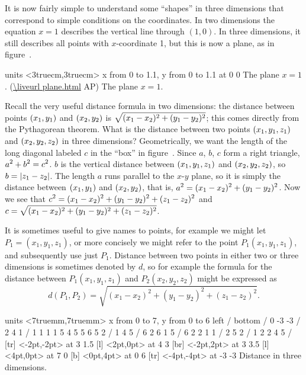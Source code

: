 It is now fairly simple to understand some ``shapes'' in three
dimensions that correspond to simple conditions on the coordinates. In
two dimensions the equation $x=1$ describes the vertical line through
$(1,0)$. In three dimensions, it still describes all points with
$x$-coordinate 1, but this is now a plane, as in
figure~.

\figure
\texonly
\vbox{\beginpicture
\normalgraphs
\ninepoint
\setcoordinatesystem units <3truecm,3truecm>
\setplotarea x from 0 to 1.1, y from 0 to 1.1
 at 0 0
\endpicture}
\begincaption
The plane $x=1$.
(\expandafter\url\expandafter{\liveurl plane.html}%
AP\endurl)
\endcaption
\endtexonly
{}
\begincaption
The plane $x=1$.
\endcaption
\endfigure

Recall the very useful distance formula in two dimensions: the
distance between points $\displaystyle (x_1,y_1)$ and $\displaystyle (x_2,y_2)$ is
$\displaystyle \sqrt{(x_1-x_2)^2+(y_1-y_2)^2}$; this comes directly from the
Pythagorean theorem. What is the distance between two points
$\displaystyle (x_1,y_1,z_1)$ and $\displaystyle (x_2,y_2,z_2)$ in three dimensions?
Geometrically, we want the length of the long diagonal labeled $c$ in
the ``box'' in figure~. Since $a$,
$b$, $c$ form a right triangle, $\displaystyle a^2+b^2=c^2$. $b$ is the vertical
distance between $\displaystyle (x_1,y_1,z_1)$ and $\displaystyle (x_2,y_2,z_2)$, so
$\displaystyle b=|z_1-z_2|$.  The length $a$ runs parallel to the $x$-$y$ plane, so
it is simply the distance between $\displaystyle (x_1,y_1)$ and $\displaystyle (x_2,y_2)$, that
is, $\displaystyle a^2=(x_1-x_2)^2+(y_1-y_2)^2$. Now we see that
$\displaystyle c^2=(x_1-x_2)^2+(y_1-y_2)^2+(z_1-z_2)^2$ and
$\displaystyle c=\sqrt{(x_1-x_2)^2+(y_1-y_2)^2+(z_1-z_2)^2}$. 

It is sometimes useful to give names to points, for example we might
let $P_1=(x_1,y_1,z_1)$, or more concisely we might refer to the point
$P_1(x_1,y_1,z_1)$, and subsequently use just $P_1$. Distance between
two points in either two or three dimensions is sometimes denoted by
$d$, so for example the formula for the distance between $P_1(x_1,y_1,z_1)$
and $P_2(x_2,y_2,z_2)$ might be expressed as
$$d(P_1,P_2)=\sqrt{(x_1-x_2)^2+(y_1-y_2)^2+(z_1-z_2)^2}.$$

\figure
\texonly
\vbox{\beginpicture
\normalgraphs
\ninepoint
\setcoordinatesystem units <7truemm,7truemm>
\setplotarea x from 0 to 7, y from 0 to 6
\axis left /
\axis bottom /
 0 -3 -3 /
\setdashes
{} 2 4 1 /
 1 1 1 1 5 4 5 5 6 5 2 /
 1 4 5 /
 6 2 6 1 5 /
\setdots
{} 6 2 2 1 1 /
 2 5 2 /
\setsolid
{} 1 2 2 4 5 /
 [tr] <-2pt,-2pt> at 3 1.5
 [l] <2pt,0pt> at 4 3
 [br] <-2pt,2pt> at 3 3.5
 [l] <4pt,0pt> at 7 0
 [b] <0pt,4pt> at 0 6
 [tr] <-4pt,-4pt> at -3 -3
\endpicture}
\endtexonly
{}
\begincaption
Distance in three dimensions.
\endcaption
\endfigure

